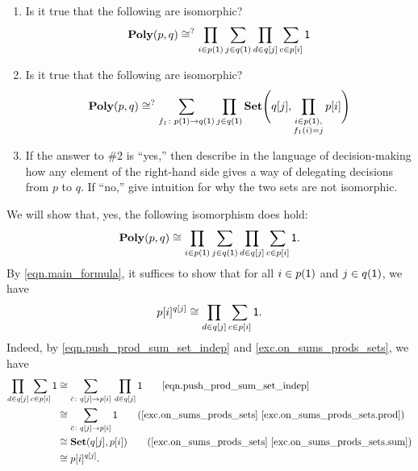 \documentclass[Book-Poly]{subfiles}
\begin{document}
\begin{exercise}\label{exc.practice_sum_prod}
\begin{enumerate}
\item Is it true that the following are isomorphic?
\begin{equation}\label{eqn.poly_p_q}
  \mathbf{Poly}(p,q)
  \cong^?
  \prod_{i\in p(\textsf{1})}\sum_{j\in q(\textsf{1})}\prod_{d\in q[j]}\sum_{c\in p[i]}\textsf{1}
\end{equation}
\item \label{exc.practice_sum_prod.useful} Is it true that the following are isomorphic?
	\begin{equation}\label{eqn.useful_misc472}
	\mathbf{Poly}(p,q)\cong^?\sum_{f_1\colon p(\textsf{1})\to q(\textsf{1})}\prod_{j\in q(\textsf{1})}\mathbf{Set}\Bigg(q[j],\prod_{\substack{i \in p(\textsf{1}), \\ f_1(i) = j}}p[i]\Bigg)
	\end{equation}
\item If the answer to \#2 is ``yes,'' then describe in the language of decision-making how any element of the right-hand side gives a way of delegating decisions from $p$ to $q$. If ``no,'' give intuition for why the two sets are not isomorphic.
\qedhere
\end{enumerate}
\begin{solution}
\begin{longenum}
\item We will show that, yes, the following isomorphism does hold:
\[
  \mathbf{Poly}(p,q)
  \cong
  \prod_{i\in p(\textsf{1})}\sum_{j\in q(\textsf{1})}\prod_{d\in q[j]}\sum_{c\in p[i]}\textsf{1}.
\]
By \eqref{eqn.main_formula}, it suffices to show that for all $i \in p(\textsf{1})$ and $j \in q(\textsf{1})$, we have
\[
    p[i]^{q[j]} \cong \prod_{d \in q[j]} \sum_{c \in p[i]} \textsf{1}.
\]
Indeed, by \eqref{eqn.push_prod_sum_set_indep} and \cref{exc.on_sums_prods_sets}, we have
\begin{align*}
    \prod_{d \in q[j]} \sum_{c \in p[i]} \1 &\iso \sum_{\bar{c} \colon q[j] \to p[i]} \, \prod_{d \in q[j]} \1 \tag*{\eqref{eqn.push_prod_sum_set_indep}} \\
    &\iso \sum_{\bar{c} \colon q[j] \to p[i]} \1 \tag{\cref{exc.on_sums_prods_sets} \cref{exc.on_sums_prods_sets.prod}} \\
    &\iso \smset(q[j], p[i]) \tag{\cref{exc.on_sums_prods_sets} \cref{exc.on_sums_prods_sets.sum}} \\
    &\iso p[i]^{q[j]}.
\end{align*}


\end{longenum}
\end{solution}
\end{exercise}
\end{document}

